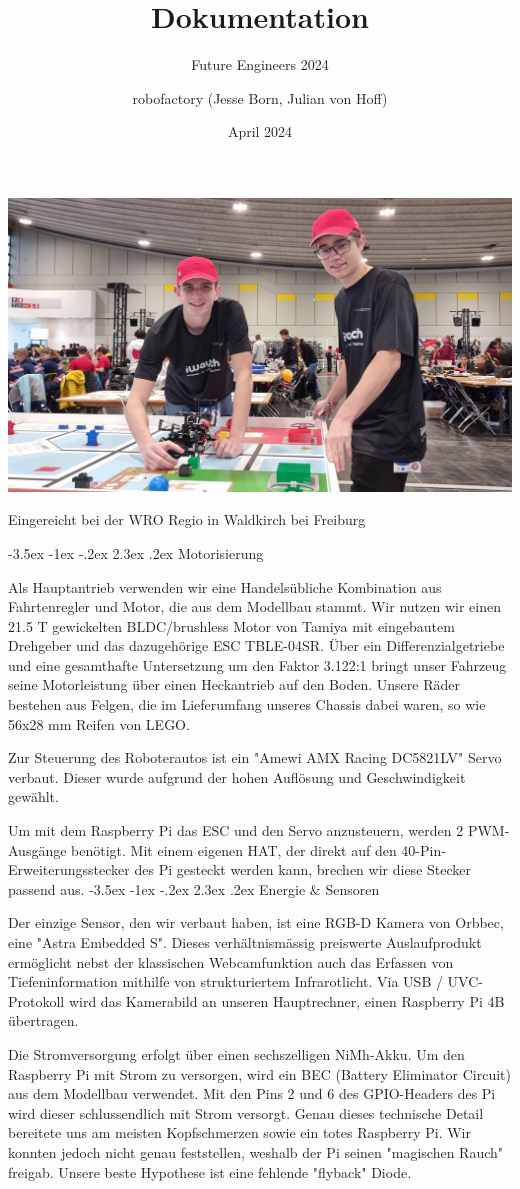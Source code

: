 \documentclass[a4paper]{scrarticle}
\makeatletter
\renewcommand\section{\@startsection {section}{1}{\z@}%
                                   {-3.5ex \@plus -1ex \@minus -.2ex}%
                                   {2.3ex \@plus.2ex}%
                                   {\Huge\AKAfont}}
\renewcommand{\maketitle}{%
																		 \begin{titlepage}
																			 \null\vfill %
																			 \begin{center}
																				{\huge\@title\par}%
																				\vspace{0.5cm} %
																				{\large\@subtitle\par} %
																				\vspace{1.5cm} %
																				{\Large\@author\par}
																				\vspace{2.5cm} %
																				\begin{center}
																					\includegraphics[width=15cm]{team}
																				\end{center}
																				\vfill
																				\vspace{0.5cm} %
																				{\large\@date\par} %
																				Eingereicht bei der WRO Regio in Waldkirch bei Freiburg
																			 \end{center}
																			 \@thanks %
																		 \end{titlepage}%
																	 }
\makeatother
\begin{document}
\title{\AKAfont\Huge\textcolor{AKSAcolor}{Dokumentation}}
\subtitle{Future Engineers 2024}
\author{robofactory (Jesse Born, Julian von Hoff)}
\date{April 2024}


\maketitle
\clearpage
\newpage



\section{Motorisierung}

Als Hauptantrieb verwenden wir eine Handelsübliche Kombination aus Fahrtenregler und Motor, die aus dem Modellbau stammt.
Wir nutzen wir einen 21.5 T gewickelten BLDC/brushless Motor von Tamiya mit eingebautem Drehgeber und das dazugehörige ESC TBLE-04SR. 
Über ein Differenzialgetriebe und eine gesamthafte Untersetzung um den Faktor 3.122:1 bringt unser Fahrzeug seine Motorleistung über einen Heckantrieb auf den Boden.
Unsere Räder bestehen aus Felgen, die im Lieferumfang unseres Chassis dabei waren, so wie 56x28 mm Reifen von LEGO.

Zur Steuerung des Roboterautos ist ein "Amewi AMX Racing DC5821LV" Servo verbaut. Dieser wurde aufgrund der hohen Auflösung und Geschwindigkeit gewählt.

Um mit dem Raspberry Pi das ESC und den Servo anzusteuern, werden 2 PWM-Ausgänge benötigt. Mit einem eigenen HAT, der direkt auf den 40-Pin-Erweiterungsstecker des Pi gesteckt werden kann, brechen wir diese Stecker passend aus.
\section{Energie \& Sensoren}

Der einzige Sensor, den wir verbaut haben, ist eine RGB-D Kamera von Orbbec, eine "Astra Embedded S".
Dieses verhältnismässig preiswerte Auslaufprodukt ermöglicht nebst der klassischen Webcamfunktion auch das Erfassen von Tiefeninformation mithilfe von strukturiertem Infrarotlicht.
Via USB / UVC-Protokoll wird das Kamerabild an unseren Hauptrechner, einen Raspberry Pi 4B übertragen.


Die Stromversorgung erfolgt über einen sechszelligen NiMh-Akku. Um den Raspberry Pi mit Strom zu versorgen, wird ein BEC (Battery Eliminator Circuit) aus dem Modellbau verwendet. 
Mit den Pins 2 und 6 des GPIO-Headers des Pi wird dieser schlussendlich mit Strom versorgt.
Genau dieses technische Detail bereitete uns am meisten Kopfschmerzen sowie ein totes Raspberry Pi. Wir konnten jedoch nicht genau feststellen, weshalb der Pi seinen "magischen Rauch" freigab. Unsere beste Hypothese ist eine fehlende "flyback" Diode.
\end{document}
